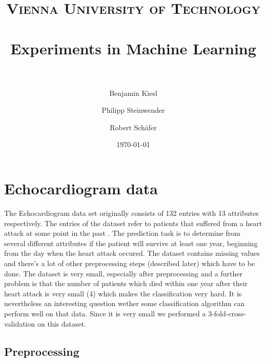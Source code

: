 \documentclass[paper=a4, fontsize=11pt]{scrartcl} %
\title{ 
\normalfont \normalsize 
\textsc{Vienna University of Technology} \\ [25pt] %
\horrule{0.5pt} \\[0.4cm] %
\huge Experiments in Machine Learning \\ %
\horrule{2pt} \\[0.5cm] %
}
\author{Benjamin Kiesl \and Philipp Steinwender \and Robert Sch\"{a}fer} %
\date{\normalsize\today} %
\numberwithin{equation}{section} %
\numberwithin{figure}{section} %
\numberwithin{table}{section} %
\begin{document}
\maketitle %




\section{Echocardiogram data}

The Echocardiogram data set originally consists of 132 entries with 13 attributes respectively. The entries of the dataset refer to patients that suffered from a heart attack at some point in the past \cite{uci-repo}. The prediction task is to determine from several different attributes if the patient will survive at least one year, beginning from the day when the heart attack occured. The dataset contains missing values and there's a lot of other preprocessing steps (described later) which have to be done. The dataset is very small, especially after preprocessing and a further problem is that the number of patients which died within one year after their heart attack is very small (4) which makes the classification very hard. It is nevertheless an interesting question wether some classification algorithm can perform well on that data. Since it is very small we performed a 3-fold-cross-validation on this dataset.

\subsection{Preprocessing}
\end{document}
